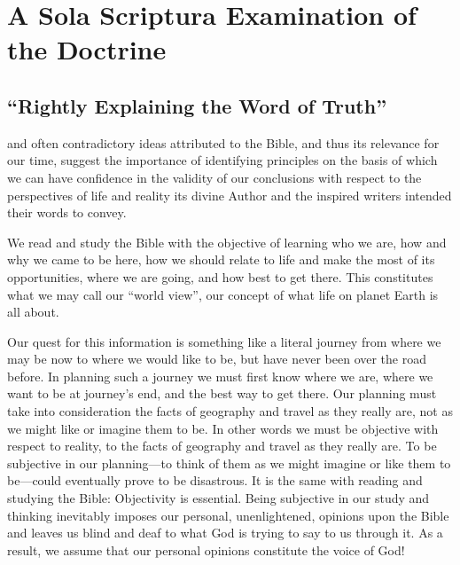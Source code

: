 \part{A Sola Scriptura Examination of the Doctrine}
\label{p:sola}

\chapter{``Rightly Explaining the Word of Truth''}
\label{ch:rightly}

 and often contradictory ideas attributed to
the Bible, and thus its relevance for our time, suggest the importance of
identifying principles on the basis of which we can have confidence in the
validity of our conclusions with respect to the perspectives of life and
reality its divine Author and the inspired writers intended their words to
convey.

We read and study the Bible with the objective of learning who we are, how
and why we came to be here, how we should relate to life and make the most
of its opportunities, where we are going, and how best to get there. This
constitutes what we may call our ``world view'', our concept of what life on
planet Earth is all about.

Our quest for this information is something like a literal journey from
where we may be now to where we would like to be, but have never been over
the road before. In planning such a journey we must first know where we are,
where we want to be at journey's end, and the best way to get there. Our
planning must take into consideration the facts of geography and travel as
they really are, not as we might like or imagine them to be. In other words
we must be objective with respect to reality, to the facts of geography and
travel as they really are. To be subjective in our planning---to think of
them as we might imagine or like them to be---could eventually prove to be
disastrous. It is the same with reading and studying the Bible: Objectivity
is essential. Being subjective in our study and thinking inevitably imposes 
our personal, unenlightened, opinions upon the Bible and leaves us blind and
deaf to what God is trying to say to us through it. As a result, we assume
that our personal opinions constitute the voice of God!

